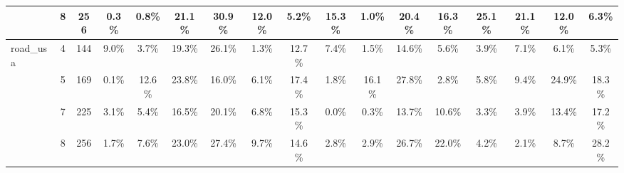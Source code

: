 \begin{tabular}[c]{| l | c | c | c | c | c | c | c | c | c | c | c | c | c | c | c | c |}
 & 8 & 256 & 0.3\%  & 0.8\%  & 21.1\%  & 30.9\%  & 12.0\%  & 5.2\%  & 15.3\%  & 1.0\%  & 20.4\%  & 16.3\%  & 25.1\%  & 21.1\%  & 12.0\%  & 6.3\%   \\ \hline
\multirow{4}{*}{road\_usa}  & 4 & 144 & 9.0\%  & 3.7\%  & 19.3\%  & 26.1\%  & 1.3\%  & 12.7\%  & 7.4\%  & 1.5\%  & 14.6\%  & 5.6\%  & 3.9\%  & 7.1\%  & 6.1\%  & 5.3\%   \\ \cline{2-17}
 & 5 & 169 & 0.1\%  & 12.6\%  & 23.8\%  & 16.0\%  & 6.1\%  & 17.4\%  & 1.8\%  & 16.1\%  & 27.8\%  & 2.8\%  & 5.8\%  & 9.4\%  & 24.9\%  & 18.3\%   \\ \cline{2-17}
 & 7 & 225 & 3.1\%  & 5.4\%  & 16.5\%  & 20.1\%  & 6.8\%  & 15.3\%  & 0.0\%  & 0.3\%  & 13.7\%  & 10.6\%  & 3.3\%  & 3.9\%  & 13.4\%  & 17.2\%   \\ \cline{2-17}
 & 8 & 256 & 1.7\%  & 7.6\%  & 23.0\%  & 27.4\%  & 9.7\%  & 14.6\%  & 2.8\%  & 2.9\%  & 26.7\%  & 22.0\%  & 4.2\%  & 2.1\%  & 8.7\%  & 28.2\%   \\ \hline
\end{tabular}